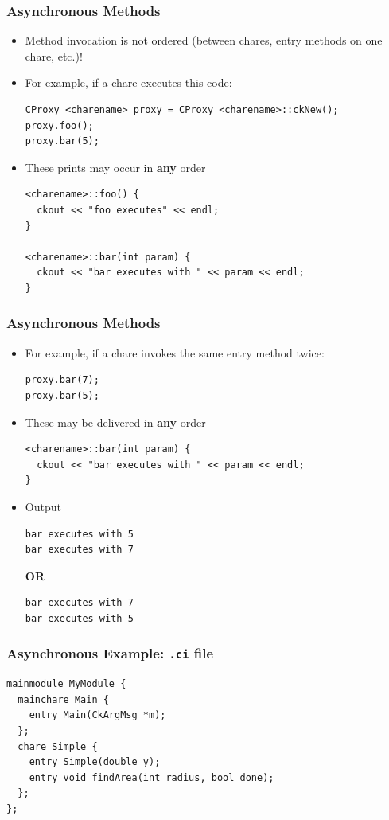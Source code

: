 \begin{frame}[fragile]
  \frametitle{Asynchronous Methods}
  \begin{itemize}
  \item Method invocation is not ordered (between chares, entry methods on one
    chare, etc.)!
  \item For example, if a chare executes this code:
  \begin{lstlisting}
CProxy_<charename> proxy = CProxy_<charename>::ckNew();
proxy.foo();
proxy.bar(5);
  \end{lstlisting}
  \item These prints may occur in \textbf{any} order
  \begin{lstlisting}
<charename>::foo() {
  ckout << "foo executes" << endl;
}

<charename>::bar(int param) {
  ckout << "bar executes with " << param << endl;
}
\end{lstlisting}
  \end{itemize}
\end{frame}

\begin{frame}[fragile]
  \frametitle{Asynchronous Methods}
  \begin{itemize}
  \item For example, if a chare invokes the same entry method twice:
  \begin{lstlisting}
proxy.bar(7);
proxy.bar(5);
  \end{lstlisting}%
  \item These may be delivered in \textbf{any} order
  \begin{lstlisting}
<charename>::bar(int param) {
  ckout << "bar executes with " << param << endl;
}
\end{lstlisting}
  \item Output
\begin{lstlisting}
bar executes with 5
bar executes with 7
\end{lstlisting}
\textbf{OR}
\begin{lstlisting}
bar executes with 7
bar executes with 5
\end{lstlisting}
  \end{itemize}
\end{frame}


\begin{frame}[fragile]
  \frametitle{Asynchronous Example: \texttt{.ci} file}
\begin{lstlisting}
mainmodule MyModule {
  mainchare Main {
    entry Main(CkArgMsg *m);
  };
  chare Simple {
    entry Simple(double y);
    entry void findArea(int radius, bool done);
  };
};
\end{lstlisting}
\end{frame}

